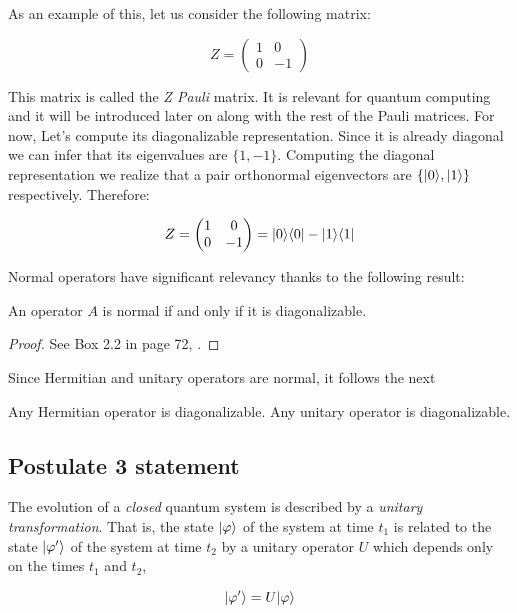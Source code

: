 \begin{exampleth}
	As an example of this, let us consider the following matrix:
	
	$$ Z = 
	\begin{pmatrix}
		1 & 0 \\
		0 & -1 
	\end{pmatrix}
	$$
	
	This matrix is called the \emph{Z Pauli} matrix. It is relevant for quantum computing and it will be introduced later on along with the rest of the Pauli matrices. For now, Let's compute its diagonalizable representation. Since it is already diagonal we can infer that its eigenvalues are $\{1, -1\}$. Computing the diagonal representation we realize that a pair orthonormal eigenvectors are $\{|0\rangle, |1\rangle\}$ respectively. Therefore:
	
	$$ Z = 
	\begin{pmatrix}
		1 & 0 \\
		0 & -1 
	\end{pmatrix} = 
	|0\rangle\langle0| - |1\rangle\langle1|
	$$
\end{exampleth}

Normal operators have significant relevancy thanks to the following result:

\begin{theorem}
\label{spectral-decomposition-theorem}
	An operator $A$ is normal if and only if it is diagonalizable.
\end{theorem}
\begin{proof}
	See Box 2.2 in page 72, \cite{Nielsen2002}.
\end{proof}

Since Hermitian and unitary operators are normal, it follows the next

\begin{corollary}
	Any Hermitian operator is diagonalizable. Any unitary operator is diagonalizable.
\end{corollary}


\subsection{Postulate 3 statement}
\label{postulate-3-section}

\begin{postulate}
	The evolution of a \emph{closed} quantum system is described by a \emph{unitary transformation}. That is, the state $|\varphi\rangle$ of the system at time $t_1$ is related to the state $|\varphi'\rangle$ of the system at time $t_2$ by a unitary operator $U$ which depends only on the times $t_1$ and $t_2$,
	
	$$ |\varphi'\rangle = U|\varphi\rangle $$
\end{postulate}

